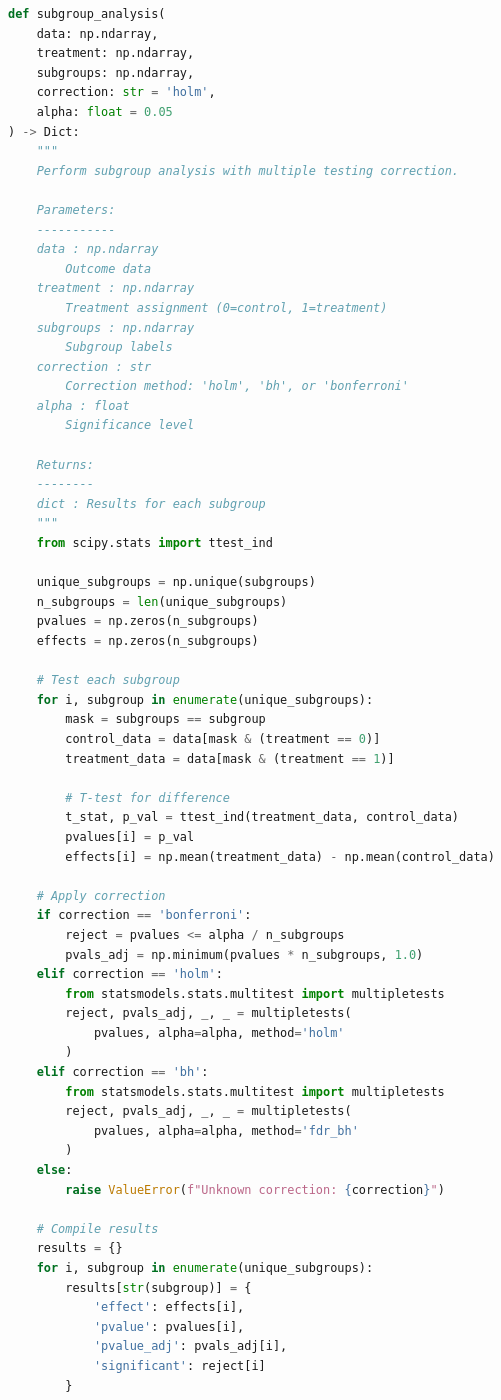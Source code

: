 \begin{lstlisting}[language=Python, caption={Subgroup Analysis with Multiple Testing}]
def subgroup_analysis(
    data: np.ndarray,
    treatment: np.ndarray,
    subgroups: np.ndarray,
    correction: str = 'holm',
    alpha: float = 0.05
) -> Dict:
    """
    Perform subgroup analysis with multiple testing correction.

    Parameters:
    -----------
    data : np.ndarray
        Outcome data
    treatment : np.ndarray
        Treatment assignment (0=control, 1=treatment)
    subgroups : np.ndarray
        Subgroup labels
    correction : str
        Correction method: 'holm', 'bh', or 'bonferroni'
    alpha : float
        Significance level

    Returns:
    --------
    dict : Results for each subgroup
    """
    from scipy.stats import ttest_ind

    unique_subgroups = np.unique(subgroups)
    n_subgroups = len(unique_subgroups)
    pvalues = np.zeros(n_subgroups)
    effects = np.zeros(n_subgroups)

    # Test each subgroup
    for i, subgroup in enumerate(unique_subgroups):
        mask = subgroups == subgroup
        control_data = data[mask & (treatment == 0)]
        treatment_data = data[mask & (treatment == 1)]

        # T-test for difference
        t_stat, p_val = ttest_ind(treatment_data, control_data)
        pvalues[i] = p_val
        effects[i] = np.mean(treatment_data) - np.mean(control_data)

    # Apply correction
    if correction == 'bonferroni':
        reject = pvalues <= alpha / n_subgroups
        pvals_adj = np.minimum(pvalues * n_subgroups, 1.0)
    elif correction == 'holm':
        from statsmodels.stats.multitest import multipletests
        reject, pvals_adj, _, _ = multipletests(
            pvalues, alpha=alpha, method='holm'
        )
    elif correction == 'bh':
        from statsmodels.stats.multitest import multipletests
        reject, pvals_adj, _, _ = multipletests(
            pvalues, alpha=alpha, method='fdr_bh'
        )
    else:
        raise ValueError(f"Unknown correction: {correction}")

    # Compile results
    results = {}
    for i, subgroup in enumerate(unique_subgroups):
        results[str(subgroup)] = {
            'effect': effects[i],
            'pvalue': pvalues[i],
            'pvalue_adj': pvals_adj[i],
            'significant': reject[i]
        }


\end{lstlisting}
